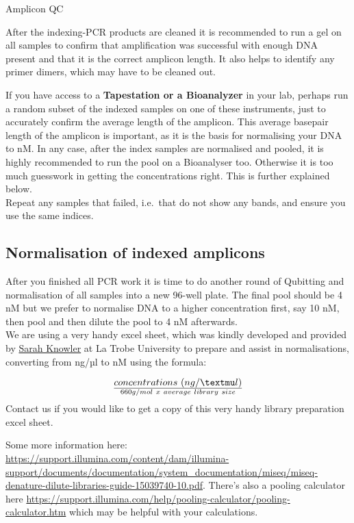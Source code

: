 \documentclass[
]{book}
\begin{document}
Amplicon QC

After the indexing-PCR products are cleaned it is recommended to run a gel on all samples to confirm that amplification was successful with enough DNA present and that it is the correct amplicon length. It also helps to identify any primer dimers, which may have to be cleaned out.

If you have access to a \textbf{Tapestation or a Bioanalyzer} in your lab, perhaps run a random subset of the indexed samples on one of these instruments, just to accurately confirm the average length of the amplicon. This average basepair length of the amplicon is important, as it is the basis for normalising your DNA to nM. In any case, after the index samples are normalised and pooled, it is highly recommended to run the pool on a Bioanalyser too. Otherwise it is too much guesswork in getting the concentrations right. This is further explained below.\\
Repeat any samples that failed, i.e.~that do not show any bands, and ensure you use the same indices.

\hfill\break

\hypertarget{normalisation-of-indexed-amplicons}{%
\subsection{Normalisation of indexed amplicons}\label{normalisation-of-indexed-amplicons}}

After you finished all PCR work it is time to do another round of Qubitting and normalisation of all samples into a new 96-well plate. The final pool should be 4 nM but we prefer to normalise DNA to a higher concentration first, say 10 nM, then pool and then dilute the pool to 4 nM afterwards.\\
We are using a very handy excel sheet, which was kindly developed and provided by \href{https://scholars.latrobe.edu.au/sknowler}{Sarah Knowler} at La Trobe University to prepare and assist in normalisations, converting from ng/µl to nM using the formula:

\[ concentrations~(ng/µl)  \over 660 g/mol~x~average~library~size\]
Contact us if you would like to get a copy of this very handy library preparation excel sheet.

Some more information here: \url{https://support.illumina.com/content/dam/illumina-support/documents/documentation/system_documentation/miseq/miseq-denature-dilute-libraries-guide-15039740-10.pdf}. There's also a pooling calculator here \url{https://support.illumina.com/help/pooling-calculator/pooling-calculator.htm} which may be helpful with your calculations.\\
\strut \\
\end{document}
